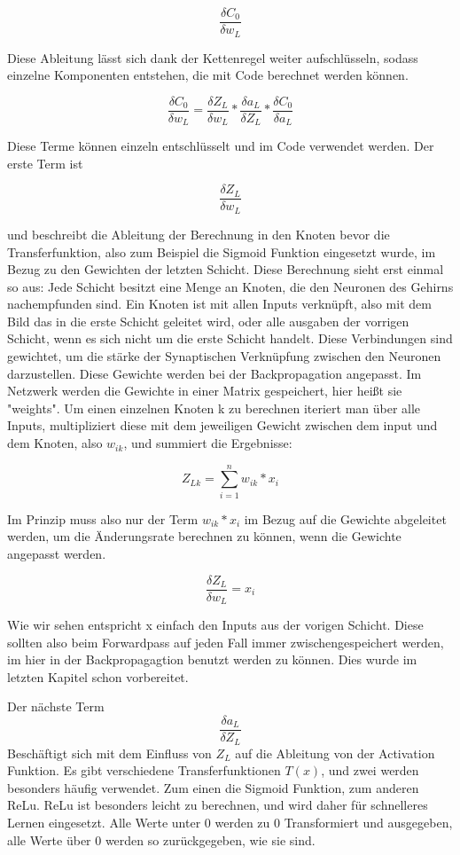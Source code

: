 \documentclass[12pt]{article}
\begin{document}
$$\frac{\delta C_0}{\delta w_L}$$

Diese Ableitung lässt sich dank der Kettenregel weiter aufschlüsseln, sodass einzelne Komponenten entstehen, die mit Code berechnet werden können.

$$\frac{\delta C_0}{\delta w_L}=
\frac{\delta Z_L}{\delta w_L}*
\frac{\delta a_L}{\delta Z_L}*
\frac{\delta C_0}{\delta a_L}$$

Diese Terme können einzeln entschlüsselt und im Code verwendet werden. Der erste Term ist

$$\frac{\delta Z_L}{\delta w_L}$$

und beschreibt die Ableitung der Berechnung in den Knoten bevor die Transferfunktion, also zum Beispiel die Sigmoid Funktion eingesetzt wurde, im Bezug zu den Gewichten der letzten Schicht.
Diese Berechnung sieht erst einmal so aus:
Jede Schicht besitzt eine Menge an Knoten, die den Neuronen des Gehirns nachempfunden sind. Ein Knoten ist mit allen Inputs verknüpft, also mit dem Bild das in die erste Schicht geleitet wird, oder alle ausgaben der vorrigen Schicht, wenn es sich nicht um die erste Schicht handelt. Diese Verbindungen sind gewichtet, um die stärke der Synaptischen Verknüpfung zwischen den Neuronen darzustellen. Diese Gewichte werden bei der Backpropagation angepasst. Im Netzwerk werden die Gewichte in einer Matrix gespeichert, hier heißt sie "weights". 
Um einen einzelnen Knoten k zu berechnen iteriert man über alle Inputs, multipliziert diese mit dem jeweiligen Gewicht zwischen dem input und dem Knoten, also $w_{ik}$, und summiert die Ergebnisse:


$$Z_{Lk}=\sum_{i = 1}^{n}w_{ik}*x_i$$

Im Prinzip muss also nur der Term $w_{ik}*x_i$ im Bezug auf die Gewichte abgeleitet werden, um die Änderungsrate berechnen zu können, wenn die Gewichte angepasst werden.

$$\frac{\delta Z_L}{\delta w_L}=x_i$$

Wie wir sehen entspricht x einfach den Inputs aus der vorigen Schicht. Diese sollten also beim Forwardpass auf jeden Fall immer zwischengespeichert werden, im hier in der Backpropagagtion benutzt werden zu können. Dies wurde im letzten Kapitel schon vorbereitet.

Der nächste Term 
$$\frac{\delta a_L}{\delta Z_L}$$ Beschäftigt sich mit dem Einfluss von $Z_L$ auf die Ableitung von der Activation Funktion. Es gibt verschiedene Transferfunktionen $T(x)$, und zwei werden besonders häufig verwendet. Zum einen die Sigmoid Funktion, zum anderen ReLu. 
ReLu ist besonders leicht zu berechnen, und wird daher für schnelleres Lernen eingesetzt. Alle Werte unter 0 werden zu 0 Transformiert und ausgegeben, alle Werte über 0 werden so zurückgegeben, wie sie sind.
\end{document}
